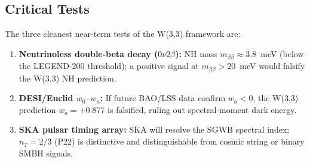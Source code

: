 \subsection{Critical Tests}

The three cleanest near-term tests of the W(3,3) framework are:
\begin{enumerate}
  \item \textbf{Neutrinoless double-beta decay ($0\nu2\beta$):}
    NH mass $m_{\beta\beta}\approx3.8$~meV (below the LEGEND-200 threshold);
    a positive signal at $m_{\beta\beta}>20$~meV would falsify the W(3,3) NH prediction.
  \item \textbf{DESI/Euclid $w_0$--$w_a$:}
    If future BAO/LSS data confirm $w_a < 0$, the W(3,3) prediction $w_a=+0.877$
    is falsified, ruling out spectral-moment dark energy.
  \item \textbf{SKA pulsar timing array:}
    SKA will resolve the SGWB spectral index; $n_T=2/3$ (P22) is distinctive
    and distinguishable from cosmic string or binary SMBH signals.
\end{enumerate}
